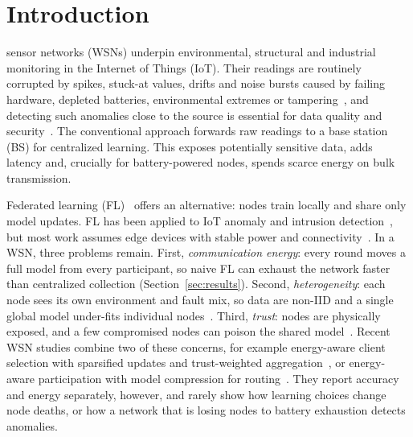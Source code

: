 \documentclass[journal]{IEEEtran}
\begin{document}
\section{Introduction}
 sensor networks (WSNs) underpin environmental, structural and industrial monitoring in the Internet of Things (IoT). Their readings are routinely corrupted by spikes, stuck-at values, drifts and noise bursts caused by failing hardware, depleted batteries, environmental extremes or tampering~\cite{ni2009,sharma2010}, and detecting such anomalies close to the source is essential for data quality and security~\cite{rajasegarar2008}. The conventional approach forwards raw readings to a base station (BS) for centralized learning. This exposes potentially sensitive data, adds latency and, crucially for battery-powered nodes, spends scarce energy on bulk transmission.

Federated learning (FL)~\cite{mcmahan2017,kairouz2021} offers an alternative: nodes train locally and share only model updates. FL has been applied to IoT anomaly and intrusion detection~\cite{nguyen2019diot,mothukuri2022}, but most work assumes edge devices with stable power and connectivity~\cite{lim2020}. In a WSN, three problems remain. First, \emph{communication energy}: every round moves a full model from every participant, so naive FL can exhaust the network faster than centralized collection (Section~\ref{sec:results}). Second, \emph{heterogeneity}: each node sees its own environment and fault mix, so data are non-IID and a single global model under-fits individual nodes~\cite{zhao2018,hsu2019}. Third, \emph{trust}: nodes are physically exposed, and a few compromised nodes can poison the shared model~\cite{blanchard2017,fang2020,uddin2025}. Recent WSN studies combine two of these concerns, for example energy-aware client selection with sparsified updates and trust-weighted aggregation~\cite{bhagyalakshmi2026}, or energy-aware participation with model compression for routing~\cite{hawkinson2025}. They report accuracy and energy separately, however, and rarely show how learning choices change node deaths, or how a network that is losing nodes to battery exhaustion detects anomalies.
\end{document}

